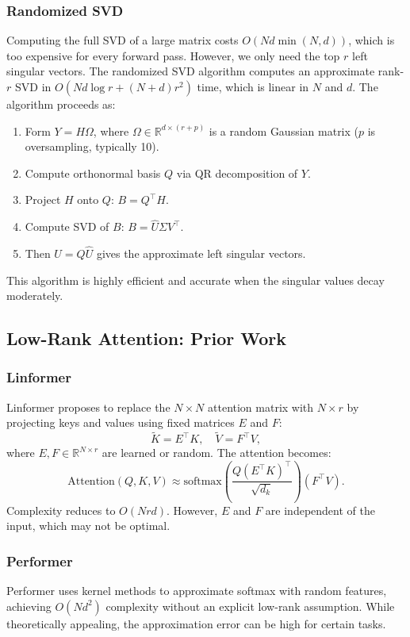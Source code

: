\documentclass[twocolumn]{article}
\begin{document}
\subsubsection{Randomized SVD}
Computing the full SVD of a large matrix costs $O(N d \min(N,d))$, which is too expensive for every forward pass. However, we only need the top $r$ left singular vectors. The randomized SVD algorithm \cite{halko2011finding} computes an approximate rank-$r$ SVD in $O(N d \log r + (N+d) r^2)$ time, which is linear in $N$ and $d$. The algorithm proceeds as:
\begin{enumerate}
    \item Form $Y = H \Omega$, where $\Omega \in \mathbb{R}^{d \times (r+p)}$ is a random Gaussian matrix ($p$ is oversampling, typically 10).
    \item Compute orthonormal basis $Q$ via QR decomposition of $Y$.
    \item Project $H$ onto $Q$: $B = Q^\top H$.
    \item Compute SVD of $B$: $B = \hat{U} \Sigma V^\top$.
    \item Then $U = Q \hat{U}$ gives the approximate left singular vectors.
\end{enumerate}
This algorithm is highly efficient and accurate when the singular values decay moderately.

\subsection{Low-Rank Attention: Prior Work}
\subsubsection{Linformer}
Linformer \cite{wang2020linformer} proposes to replace the $N \times N$ attention matrix with $N \times r$ by projecting keys and values using fixed matrices $E$ and $F$:
\[
\tilde{K} = E^\top K,\quad \tilde{V} = F^\top V,
\]
where $E, F \in \mathbb{R}^{N \times r}$ are learned or random. The attention becomes:
\[
\text{Attention}(Q,K,V) \approx \text{softmax}\left( \frac{Q (E^\top K)^\top}{\sqrt{d_k}} \right) (F^\top V).
\]
Complexity reduces to $O(N r d)$. However, $E$ and $F$ are independent of the input, which may not be optimal.

\subsubsection{Performer}
Performer \cite{choromanski2020rethinking} uses kernel methods to approximate softmax with random features, achieving $O(N d^2)$ complexity without an explicit low-rank assumption. While theoretically appealing, the approximation error can be high for certain tasks.
\end{document}
